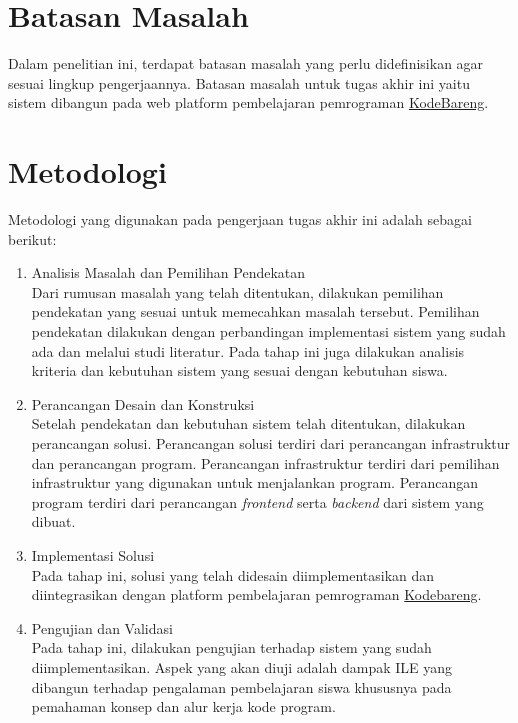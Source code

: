 \section{Batasan Masalah}
Dalam penelitian ini, terdapat batasan masalah yang perlu didefinisikan agar sesuai lingkup pengerjaannya. Batasan masalah untuk tugas akhir ini yaitu sistem dibangun pada web platform pembelajaran pemrograman \href{https://kodebareng.id}{KodeBareng}.

\section{Metodologi}
Metodologi yang digunakan pada pengerjaan tugas akhir ini adalah sebagai berikut:

\begin{enumerate}
      \item Analisis Masalah dan Pemilihan Pendekatan \\
            Dari rumusan masalah yang telah ditentukan, dilakukan pemilihan pendekatan yang sesuai untuk memecahkan masalah tersebut. Pemilihan pendekatan dilakukan dengan perbandingan implementasi sistem yang sudah ada dan melalui studi literatur. Pada tahap ini juga dilakukan analisis kriteria dan kebutuhan sistem yang sesuai dengan kebutuhan siswa.
      \item Perancangan Desain dan Konstruksi \\
            Setelah pendekatan dan kebutuhan sistem telah ditentukan, dilakukan perancangan solusi. Perancangan solusi terdiri dari perancangan infrastruktur dan perancangan program. Perancangan infrastruktur terdiri dari pemilihan infrastruktur yang digunakan untuk menjalankan program. Perancangan program terdiri dari perancangan \textit{frontend} serta \textit{backend} dari sistem yang dibuat.
      \item Implementasi Solusi \\
            Pada tahap ini, solusi yang telah didesain diimplementasikan dan diintegrasikan dengan platform pembelajaran pemrograman \href{https://kodebareng.id}{Kodebareng}.
      \item Pengujian dan Validasi \\
            Pada tahap ini, dilakukan pengujian terhadap sistem yang sudah diimplementasikan. Aspek yang akan diuji adalah dampak ILE yang dibangun terhadap pengalaman pembelajaran siswa khususnya pada pemahaman konsep dan alur kerja kode program.
\end{enumerate}

